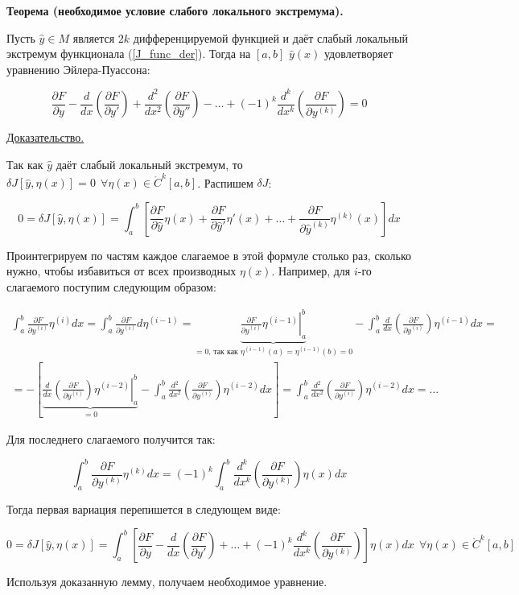 \textbf{Теорема (необходимое условие слабого локального экстремума).}

Пусть $\widehat{y} \in M$ является $2k$ дифференцируемой функцией и 
даёт слабый локальный экстремум функционала (\ref{J_func_der}).
Тогда на $[a, b]$ $\widehat{y}(x)$ удовлетворяет 
уравнению Эйлера-Пуассона:

\begin{equation}\label{euler_pois_eq}
\frac{\partial F}{\partial y} - 
\frac{d}{dx} \left( \frac{\partial F}{\partial y'} \right) +
\frac{d^2}{dx^2} \left( \frac{\partial F}{\partial y''} \right) - \dots
+ (-1)^k 
\frac{d^k}{dx^k} \left( \frac{\partial F}{\partial y^{(k)}} \right) = 0
\end{equation}

\underline{Доказательство.}

Так как $\widehat{y}$ даёт слабый локальный экстремум, то
$\delta J [\widehat{y}, \eta(x)] = 0 \ \ 
\forall \eta(x) \in \mathring{C}^k [a, b]$. Распишем $\delta J$:

$$
0 = \delta J [\widehat{y}, \eta(x)] = 
\int_a^b \left[ 
\frac{\partial F}{\partial \widehat{y}} \eta(x) + 
\frac{\partial F}{\partial \widehat{y}'} \eta'(x) + \dots + 
\frac{\partial F}{\partial \widehat{y}^{(k)}} \eta^{(k)}(x)
\right] dx
$$
\pagebreak

Проинтегрируем по частям каждое слагаемое в этой формуле 
столько раз, сколько нужно, чтобы избавиться от всех производных $\eta(x)$.
Например, для $i$-го слагаемого поступим следующим образом:

\begin{multline*}
\int_a^b \frac{\partial F}{\partial y^{(i)}} \eta^{(i)} dx = 
\int_a^b \frac{\partial F}{\partial y^{(i)}} d\eta^{(i - 1)} = 
\underbrace{\left. \frac{\partial F}{\partial y^{(i)}} \eta^{(i - 1)} 
\right|_a^b}_{= 0 \text{, так как } 
\eta^{(i - 1)}(a) = \eta^{(i - 1)}(b) = 0} - 
\int_a^b \frac{d}{dx} \left( \frac{\partial F}{\partial y^{(i)}} \right)
\eta^{(i - 1)} dx = \\
= - \left[ 
\underbrace{\left. \frac{d}{dx} \left( 
\frac{\partial F}{\partial y^{(i)}} \right) 
\eta^{(i - 2)} \right|_a^b}_{ = 0} - 
\int_a^b \frac{d^2}{dx^2} \left( 
\frac{\partial F}{\partial y^{(i)}} \right) \eta^{(i - 2)} dx
\right] = 
\int_a^b \frac{d^2}{dx^2} \left( \frac{\partial F}{\partial y^{(i)}}
\right) \eta^{(i - 2)} dx = \dots
\end{multline*}

Для последнего слагаемого получится так:

$$
\int_a^b \frac{\partial F}{\partial y^{(k)}} \eta^{(k)} dx = 
(-1)^k \int_a^b \frac{d^k}{dx^k} \left( 
\frac{\partial F}{\partial y^{(k)}} \right) \eta(x) dx
$$

Тогда первая вариация перепишется в следующем виде:

$$
0 = \delta J [\widehat{y}, \eta(x)] = 
\int_a^b \left[ 
\frac{\partial F}{\partial y} - 
\frac{d}{dx} \left( \frac{\partial F}{\partial y'} \right) + \dots + 
(-1)^k \frac{d^k}{dx^k} \left( \frac{\partial F}{\partial y^{(k)}} \right)
\right] \eta(x) dx \ \ 
\forall \eta(x) \in \mathring{C}^k [a, b]
$$

Используя доказанную лемму, получаем необходимое уравнение.
